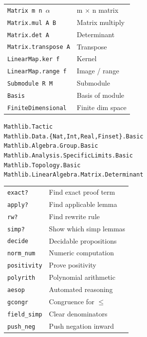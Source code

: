 \documentclass[10pt]{extarticle}
\begin{document}
\begin{multicols}{2}
\begin{tabularx}{\linewidth}{@{}l@{\enspace}Y@{}}
\texttt{Matrix m n $\alpha$}       & m $\times$ n matrix \\
\texttt{Matrix.mul A B}             & Matrix multiply \\
\texttt{Matrix.det A}               & Determinant \\
\texttt{Matrix.transpose A}         & Transpose \\
\texttt{LinearMap.ker f}             & Kernel \\
\texttt{LinearMap.range f}           & Image / range \\
\texttt{Submodule R M}              & Submodule \\
\texttt{Basis}                       & Basis of module \\
\texttt{FiniteDimensional}           & Finite dim space \\
\end{tabularx}

{\footnotesize
\texttt{Mathlib.Tactic} \\
\texttt{Mathlib.Data.\{Nat,Int,Real,Finset\}.Basic} \\
\texttt{Mathlib.Algebra.Group.Basic} \\
\texttt{Mathlib.Analysis.SpecificLimits.Basic} \\
\texttt{Mathlib.Topology.Basic} \\
\texttt{Mathlib.LinearAlgebra.Matrix.Determinant}
}

\begin{tabularx}{\linewidth}{@{}l@{\enspace}Y@{}}
\texttt{exact?}       & Find exact proof term \\
\texttt{apply?}       & Find applicable lemma \\
\texttt{rw?}          & Find rewrite rule \\
\texttt{simp?}        & Show which simp lemmas \\
\texttt{decide}       & Decidable propositions \\
\texttt{norm\_num}    & Numeric computation \\
\texttt{positivity}   & Prove positivity \\
\texttt{polyrith}     & Polynomial arithmetic \\
\texttt{aesop}        & Automated reasoning \\
\texttt{gcongr}       & Congruence for $\le$ \\
\texttt{field\_simp}  & Clear denominators \\
\texttt{push\_neg}    & Push negation inward \\
\end{tabularx}

\end{multicols}
\end{document}
